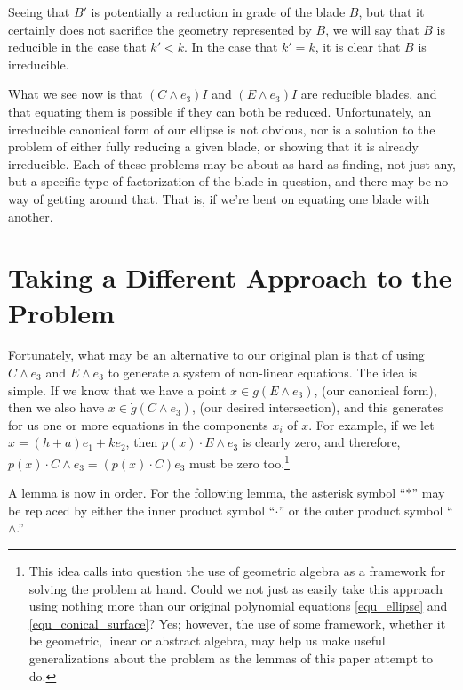 \documentclass{birkjour}
\theoremstyle{definition}
\theoremstyle{remark}
\numberwithin{equation}{section}
\newcommand{\gd}{\dot{g}}
\begin{document}
Seeing that $B'$ is potentially a reduction in grade of the blade $B$, but that it certainly does
not sacrifice the geometry represented by $B$, we will say that $B$ is reducible
in the case that $k'<k$.  In the case that $k'=k$, it is clear that $B$ is irreducible.

What we see now is that $(C\wedge e_3)I$ and $(E\wedge e_3)I$ are reducible blades,
and that equating them is possible if they can both be reduced.  Unfortunately,
an irreducible canonical form of our ellipse is not obvious, nor is a solution to the problem
of either fully reducing a given blade, or showing that it is already irreducible.  Each of these
problems may be about as hard  as finding, not just any, but a specific type of factorization
of the blade in question, and there may be no
way of getting around that.  That is, if we're bent on equating one blade with another.

\section{Taking a Different Approach to the Problem}

Fortunately, what may be an alternative to our original plan is that of using
$C\wedge e_3$ and $E\wedge e_3$ to generate a system of non-linear
equations.  The idea is simple.  If we know that we have a point $x\in\gd(E\wedge e_3)$, (our
canonical form), then we also have $x\in\gd(C\wedge e_3)$, (our desired intersection), and this generates
for us one or more equations in the components $x_i$ of $x$.  For example,
if we let $x=(h+a)e_1 + ke_2$, then $p(x)\cdot E\wedge e_3$ is clearly
zero, and therefore, $p(x)\cdot C\wedge e_3=(p(x)\cdot C)e_3$ must be zero too.\footnote{This
idea calls into question the use of geometric algebra as a framework for solving
the problem at hand.  Could we not just as easily take this approach using nothing
more than our original polynomial equations \eqref{equ_ellipse} and \eqref{equ_conical_surface}?
Yes; however, the use of some framework, whether it be geometric, linear or abstract algebra,
may help us make useful generalizations about the problem as the lemmas of this
paper attempt to do.}

A lemma is now in order.  For the following lemma, the asterisk symbol ``$*$'' may be
replaced by either the inner product symbol ``$\cdot$'' or the outer product symbol ``$\wedge$.''
\end{document}
